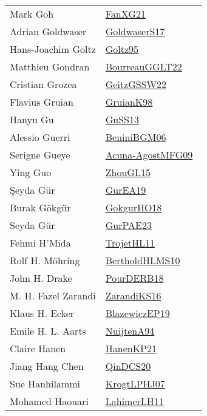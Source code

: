 {\begin{longtable}{p{4cm}p{20cm}}
Mark Goh & \href{works/FanXG21.pdf}{FanXG21}~\cite{FanXG21}\\
Adrian Goldwaser & \href{works/GoldwaserS17.pdf}{GoldwaserS17}~\cite{GoldwaserS17}\\
Hans{-}Joachim Goltz & \href{works/Goltz95.pdf}{Goltz95}~\cite{Goltz95}\\
Matthieu Gondran & \href{works/BourreauGGLT22.pdf}{BourreauGGLT22}~\cite{BourreauGGLT22}\\
Cristian Grozea & \href{works/GeitzGSSW22.pdf}{GeitzGSSW22}~\cite{GeitzGSSW22}\\
Flavius Gruian & \href{works/GruianK98.pdf}{GruianK98}~\cite{GruianK98}\\
Hanyu Gu & \href{works/GuSS13.pdf}{GuSS13}~\cite{GuSS13}\\
Alessio Guerri & \href{works/BeniniBGM06.pdf}{BeniniBGM06}~\cite{BeniniBGM06}\\
Serigne Gueye & \href{works/Acuna-AgostMFG09.pdf}{Acuna-AgostMFG09}~\cite{Acuna-AgostMFG09}\\
Ying Guo & \href{works/ZhouGL15.pdf}{ZhouGL15}~\cite{ZhouGL15}\\
Şeyda G{\"u}r & \href{works/GurEA19.pdf}{GurEA19}~\cite{GurEA19}\\
Burak G{\"{o}}kg{\"{u}}r & \href{}{GokgurHO18}~\cite{GokgurHO18}\\
Seyda G{\"{u}}r & \href{works/GurPAE23.pdf}{GurPAE23}~\cite{GurPAE23}\\
Fehmi H'Mida & \href{works/TrojetHL11.pdf}{TrojetHL11}~\cite{TrojetHL11}\\
Rolf H. M{\"{o}}hring & \href{works/BertholdHLMS10.pdf}{BertholdHLMS10}~\cite{BertholdHLMS10}\\
John H. Drake & \href{works/PourDERB18.pdf}{PourDERB18}~\cite{PourDERB18}\\
M. H. Fazel Zarandi & \href{works/ZarandiKS16.pdf}{ZarandiKS16}~\cite{ZarandiKS16}\\
Klaus H. Ecker & \href{}{BlazewiczEP19}~\cite{BlazewiczEP19}\\
Emile H. L. Aarts & \href{}{NuijtenA94}~\cite{NuijtenA94}\\
Claire Hanen & \href{works/HanenKP21.pdf}{HanenKP21}~\cite{HanenKP21}\\
Jiang Hang Chen & \href{works/QinDCS20.pdf}{QinDCS20}~\cite{QinDCS20}\\
Sue Hanhilammi & \href{works/KrogtLPHJ07.pdf}{KrogtLPHJ07}~\cite{KrogtLPHJ07}\\
Mohamed Haouari & \href{works/LahimerLH11.pdf}{LahimerLH11}~\cite{LahimerLH11}\\

\end{longtable}}

